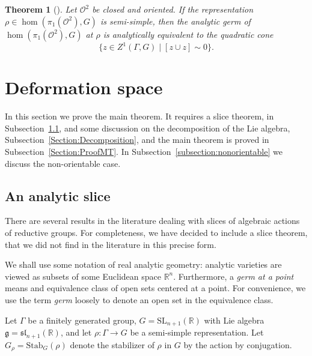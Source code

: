 \documentclass[a4paper,11pt]{article}
\newtheorem{Theorem}{Theorem}[section]
\begin{document}
\begin{Theorem}[\cite{GoldmanMaryland,GoldmanMillson,Simpson}]
\label{Theorem:Quadratic} Let $\mathcal O^2$ be closed and oriented. If the representation  $\rho\in \hom(\pi_1(\mathcal O^2)   , G)$ is semi-simple, then the analytic germ of 
 $\hom(\pi_1(\mathcal O^2), G)$ at $\rho$ is 
 analytically equivalent to the quadratic cone
 $$
 \{ z \in Z^1(\Gamma,G)\mid [ z\cup z] \sim 0 \}.
 $$
\end{Theorem}

 
 
\section{Deformation space}
\label{Section:DefSpace}

In this section we prove the main theorem. It requires a slice theorem, in Subsection~\ref{Section:slice}, and some discussion
on the decomposition of the Lie algebra, Subsection~\ref{Section:Decomposition}, and the main theorem is proved in 
Subsection~\ref{Section:ProofMT}.
In Subsection~\ref{subsection:nonorientable} we discuss the non-orientable case.

\subsection{An   analytic slice}
\label{Section:slice}

There are several results in the literature dealing with slices of algebraic actions of reductive groups. 
For completeness, we have decided to include a slice theorem, that we did not find in the literature in this precise form.

We shall use some notation of real analytic geometry: analytic varieties are viewed
as subsets of some Euclidean space $\mathbb R^n$. Furthermore,  a \emph{germ at a point} means
and equivalence class of open sets centered at a point. For convenience,  we use the term \emph{germ} loosely to denote an open set  in the equivalence class.

Let $\Gamma$ be a finitely generated group, 
$G=\mathrm{SL}_{n+1}(\mathbb R)$ with Lie algebra
$\mathfrak g= \mathfrak{sl}_{n+1}(\mathbb R)$, and 
let $\rho\colon \Gamma\to G$ be a semi-simple representation.
Let $G_\rho=\mathrm{Stab}_G(\rho)$ denote the stabilizer
of $\rho$ in $G$ by the action by conjugation.
\end{document}
